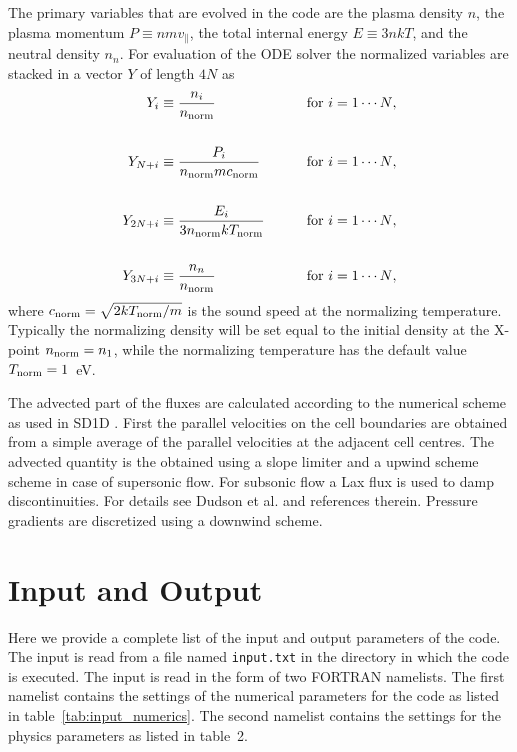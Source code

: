 \documentclass[amsmath,amssymb,a4]{revtex4}
\begin{document}
The primary variables that are evolved in the code are the plasma density $n$, the plasma momentum $P \equiv n m v_\parallel$, the total internal energy $E \equiv 3 n k T$, and the neutral density $n_n$. For evaluation of the ODE solver the normalized variables are stacked in a vector $Y$ of length $4N$ as
\begin{eqnarray}
    Y_i        &\equiv {\displaystyle n_i \over n_{\rm norm} } &\quad\quad\hbox{for $i = 1 \cdots N$}, \nonumber \\ \nonumber \\
    Y_{N + i}  &\equiv {\displaystyle P_i \over n_{\rm norm} m c_{\rm norm} } &\quad\quad\hbox{for $i = 1 \cdots N$}, \nonumber \\ \label{solution_vector} \\
    Y_{2N + i} &\equiv {\displaystyle E_i \over 3 n_{\rm norm} k T_{\rm norm} } &\quad\quad\hbox{for $i = 1 \cdots N$},  \nonumber\\ \nonumber \\
    Y_{3N + i} &\equiv {\displaystyle n_n \over n_{\rm norm} } &\quad\quad\hbox{for $i = 1 \cdots N$}, \nonumber
\end{eqnarray}
where $c_{\rm norm} = \sqrt{2 k T_{\rm norm}/m}$ is the sound speed at the normalizing temperature. Typically the normalizing density will be set equal to the initial density at the X-point $n_{\rm norm} = n_1$, while the normalizing temperature has the default value $T_{\rm norm} = 1$~eV.

The advected part of the fluxes are calculated according to the numerical scheme as used in SD1D \cite{SD1D}. First the parallel velocities on the cell boundaries are obtained from a simple average of the parallel velocities at the adjacent cell centres. The advected quantity is the obtained using a slope limiter and a upwind scheme scheme in case of supersonic flow. For subsonic flow a Lax flux is used to damp discontinuities. For details see Dudson et al. \cite{dudson2019} and references therein. Pressure gradients are discretized using a downwind scheme.


\section{Input and Output}\label{IO}

Here we provide a complete list of the input and output parameters of the code. The input is read from a file named {\tt input.txt} in the directory in which the code is executed. The input is read in the form of two FORTRAN namelists. The first namelist contains the settings of the numerical parameters for the code as listed in table~\ref{tab:input_numerics}. The second namelist contains the settings for the physics parameters as listed in table~2.
\end{document}
